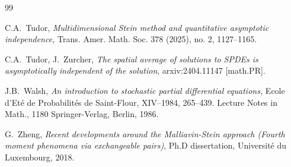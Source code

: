 \documentclass[letterpaper, 11pt,  reqno]{amsart}
\numberwithin{equation}{section}
\numberwithin{theorem}{section}
\begin{document}
\begin{thebibliography}{99}
 


C.A.~Tudor,
{\it Multidimensional Stein method and quantitative asymptotic independence,}
Trans. Amer. Math. Soc. 378 (2025), no. 2, 1127--1165.

 




C.A.~Tudor,  J.~Zurcher,
{\it The spatial average of solutions to SPDEs is asymptotically
independent of the solution},
 arxiv:2404.11147  [math.PR].




J.B.~Walsh,
{\it An introduction to stochastic partial differential equations,}
Ecole d'Et\'{e} de Probabilit\'{e}s
de Saint-Flour,
XIV--1984,
265--439.
Lecture Notes in Math., 1180
Springer-Verlag, Berlin, 1986.

 

G.~Zheng, 
{\it Recent developments around the Malliavin-Stein approach
 {\rm(}Fourth moment phenomena via
exchangeable pairs{\rm)}}, Ph.D dissertation, 
Universit\'e du Luxembourg, 2018.



\end{thebibliography}
\end{document}
